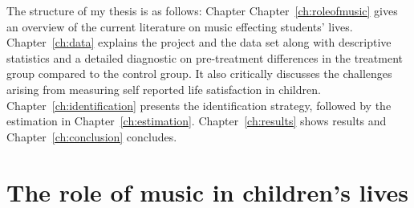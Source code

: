 \documentclass[a4, 12pt]{article}
\begin{document}
The structure of my thesis is as follows: Chapter Chapter~\ref{ch:roleofmusic} gives an overview of the current literature on music effecting students' lives. Chapter~\ref{ch:data} explains the project and the data set along with descriptive statistics and a detailed diagnostic on pre-treatment differences in the treatment group compared to the control group. It also critically discusses the challenges arising from measuring self reported life satisfaction in children. Chapter~\ref{ch:identification} presents the identification strategy, followed by the estimation in Chapter~\ref{ch:estimation}. Chapter~\ref{ch:results} shows results and Chapter~\ref{ch:conclusion} concludes.

\hypertarget{the-role-of-music-in-childrens-lives}{%
\section{The role of music in children's lives}\label{the-role-of-music-in-childrens-lives}}
\end{document}
